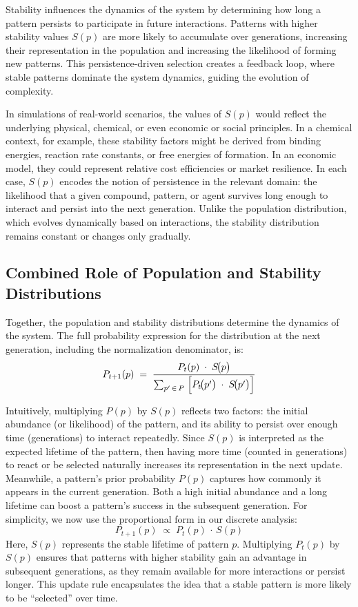 \documentclass[entropy,article,submit,pdftex,moreauthors]{Definitions/mdpi}
\begin{document}
Stability influences the dynamics of the system by determining how long a pattern persists to participate in future interactions. Patterns with higher stability values \( S(p) \) are more likely to accumulate over generations, increasing their representation in the population and increasing the likelihood of forming new patterns. This persistence-driven selection creates a feedback loop, where stable patterns dominate the system dynamics, guiding the evolution of complexity. 

In simulations of real-world scenarios, the values of \(S(p)\) would reflect the underlying physical, chemical, or even economic or social principles. In a chemical context, for example, these stability factors might be derived from binding energies, reaction rate constants, or free energies of formation. In an economic model, they could represent relative cost efficiencies or market resilience. In each case, \(S(p)\) encodes the notion of persistence in the relevant domain: the likelihood that a given compound, pattern, or agent survives long enough to interact and persist into the next generation. Unlike the population distribution, which evolves dynamically based on interactions, the stability distribution remains constant or changes only gradually. 

\subsection{Combined Role of Population and Stability Distributions}

Together, the population and stability distributions determine the dynamics of the system. The full probability expression for the distribution at the next generation, including the normalization denominator, is:
\begin{equation}
\label{eq:ba_update}
P_{t+1}(p)
\;=\;
\frac{\,P_{t}(p)\;\cdot\;S\!\bigl(p\bigr)\,}
     {\sum_{p'\,\in\,P}\;\Bigl[P_{t}\!\bigl(p'\bigr)\;\cdot\;S\!\bigl(p'\bigr)\Bigr]}
\end{equation}

Intuitively, multiplying $P(p)$ by $S(p)$ reflects two factors: the initial abundance (or likelihood) of the pattern, and its ability to persist over enough time (generations) to interact repeatedly. Since $S(p)$ is interpreted as the expected lifetime of the pattern, then having more time (counted in generations) to react or be selected naturally increases its representation in the next update. Meanwhile, a pattern's prior probability $P(p)$ captures how commonly it appears in the current generation. Both a high initial abundance and a long lifetime can boost a pattern's success in the subsequent generation. For simplicity, we now use the proportional form in our discrete analysis:
\begin{equation}
P_{t+1}(p) \;\propto\; P_t(p)\,\cdot\,S(p)
\end{equation}
Here, $S(p)$ represents the stable lifetime of pattern $p$. Multiplying $P_t(p)$ by $S(p)$ ensures that patterns with higher stability gain an advantage in subsequent generations, as they remain available for more interactions or persist longer. This update rule encapsulates the idea that a stable pattern is more likely to be ``selected'' over time. 
\end{document}
